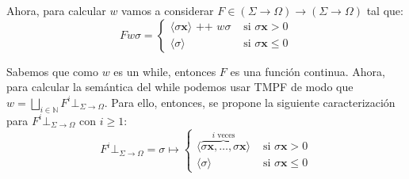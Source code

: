 \documentclass{article}
\newcommand{\N}{\mathbb{N}}
\newcommand{\x}{\textbf{x}}
\newcommand{\supr}{\bigsqcup\limits}
\newcommand{\concat}{\texttt{ ++ }}
\newcommand{\cdomfo}{\Sigma \to \Omega}
\newcommand{\cfbotfo}{\bot_{\cdomfo}}
\newcommand{\cout}[1]{\langle #1\rangle}
\begin{document}
Ahora, para calcular $w$ vamos a considerar $F \in (\cdomfo) \to (\cdomfo)$ tal que:
\begin{equation*}
  F w \sigma = \begin{cases}
    \cout{\sigma\x} \concat w\sigma &\text{ si }\sigma\x > 0 \\ 
    \cout{\sigma} &\text{ si }\sigma\x \leq 0
  \end{cases}
\end{equation*}

Sabemos que como $w$ es un while, entonces $F$ es una función continua.
Ahora, para calcular la semántica del while podemos usar TMPF de modo que $w = \supr_{i \in \N} F^i \cfbotfo$.
Para ello, entonces, se propone la siguiente caracterización para $F^i \cfbotfo$ con $i \geq 1$:
\begin{equation*}
  F^i \cfbotfo = \sigma \mapsto \begin{cases}
    \cout{\overbrace{\sigma\x, \dots, \sigma\x}^{i \text{ veces}}} &\text{ si } \sigma\x > 0 \\ 
    \cout{\sigma} &\text{ si } \sigma\x \leq 0
  \end{cases}
\end{equation*}
\end{document}
